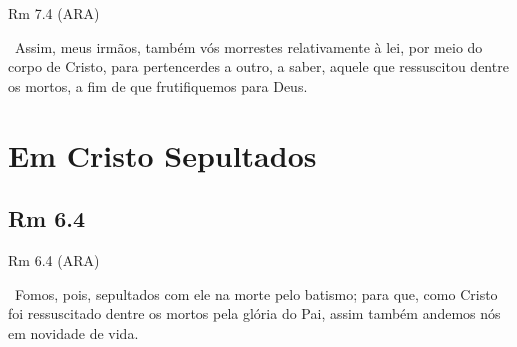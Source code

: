 \documentclass[12pt,aspectratio=169]{beamer}
\newcommand{\ver}[1]{%
    \raisebox{0.50ex}{%
        \scalebox{1.1}{%
            \pmb{\textbf{\textcolor{BSpbg}{#1}}}%
        }%
    }%
}
\newcommand{\QUOTE}[1]{%
    \par\noindent\hspace*{0.05\linewidth}%
    \begin{minipage}{0.9\linewidth}%
        \linespread{1.35}\large{#1}%
    \end{minipage}%
}
\newcommand{\YEL}[1]{{\textcolor{TXyel}{#1}}}
\newcommand{\GRE}[1]{{\textcolor{TXgre}{#1}}}
\newcommand{\MAG}[1]{{\textcolor{TXmag}{#1}}}
\begin{document}

    \begin{frame}{Rm 7.4 (ARA)}
        \QUOTE{%
            \ver{4}~Assim, meus irmãos, também vós \YEL{morrestes relativamente à lei}, \MAG{por
            meio do corpo de Cristo}, para pertencerdes a outro, a saber, aquele que ressuscitou
            dentre os mortos, a fim de que \GRE{frutifiquemos para Deus}.
        }
    \end{frame}

\section{Em Cristo Sepultados}

    \subsection{Rm 6.4}

    \begin{frame}{Rm 6.4 (ARA)}
        \QUOTE{%
            \ver{4}~\YEL{Fomos}, pois, \YEL{sepultados com ele na morte} pelo batismo; para que,
            como Cristo foi ressuscitado dentre os mortos pela glória do Pai, assim também
            \GRE{andemos nós em novidade de vida}.
        }
    \end{frame}
\end{document}
